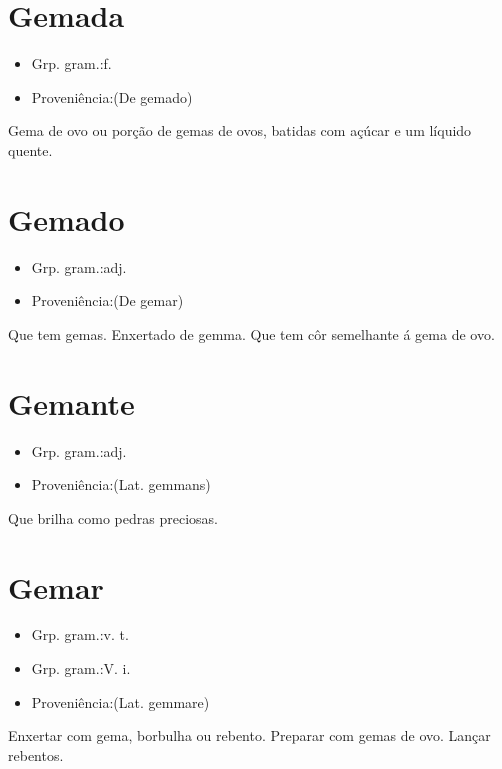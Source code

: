 \section{Gemada}
\begin{itemize}
\item {Grp. gram.:f.}
\end{itemize}
\begin{itemize}
\item {Proveniência:(De \textunderscore gemado\textunderscore )}
\end{itemize}
Gema de ovo ou porção de gemas de ovos, batidas com açúcar e um líquido quente.
\section{Gemado}
\begin{itemize}
\item {Grp. gram.:adj.}
\end{itemize}
\begin{itemize}
\item {Proveniência:(De \textunderscore gemar\textunderscore )}
\end{itemize}
Que tem gemas.
Enxertado de gemma.
Que tem côr semelhante á gema de ovo.
\section{Gemante}
\begin{itemize}
\item {Grp. gram.:adj.}
\end{itemize}
\begin{itemize}
\item {Proveniência:(Lat. \textunderscore gemmans\textunderscore )}
\end{itemize}
Que brilha como pedras preciosas.
\section{Gemar}
\begin{itemize}
\item {Grp. gram.:v. t.}
\end{itemize}
\begin{itemize}
\item {Grp. gram.:V. i.}
\end{itemize}
\begin{itemize}
\item {Proveniência:(Lat. \textunderscore gemmare\textunderscore )}
\end{itemize}
Enxertar com gema, borbulha ou rebento.
Preparar com gemas de ovo.
Lançar rebentos.
